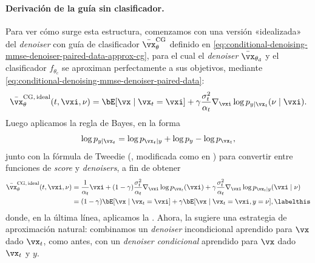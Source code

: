 \documentclass[../../book-main_es.tex]{subfiles}
\begin{document}
\paragraph{Derivación de la guía sin clasificador.} Para ver cómo surge esta
estructura, comenzamos con una versión «idealizada» del \textit{denoiser} con guía de clasificador
$\bar{\vx}_{\theta}^{\mathrm{CG}}$ definido en 
\eqref{eq:conditional-denoising-mmse-denoiser-paired-data-approx-cg},
para el cual el \textit{denoiser} $\bar{\vx}_{\theta_{\mathrm{d}}}$ y el clasificador
$f_{\theta_{\mathrm{c}}}$ se aproximan perfectamente a sus objetivos, mediante
\eqref{eq:conditional-denoising-mmse-denoiser-paired-data}:
\begin{equation}\label{eq:conditional-denoising-mmse-denoiser-paired-data-exact-cg}
    \bar{\vx}_{\theta}^{\mathrm{CG,\,ideal}}(t, \vxi, \nu)
    =
    \bE[\vx \mid \vx_t=\vxi]
    + \gamma\frac{\sigma_t^2}{\alpha_t}
    \nabla_{\vxi}\log p_{y \mid \vx_t}(\nu\mid \vxi).
\end{equation}
Luego aplicamos la regla de Bayes, en la forma
\begin{equation}
    \log p_{y \mid \vx_t}
    =
    \log p_{\vx_t \mid y} + \log p_{y} - \log p_{\vx_t},
\end{equation}
junto con la fórmula de Tweedie (, modificada como en
) para convertir entre funciones de \textit{score} y \textit{denoisers},
a fin de obtener
\begin{align*}
    \bar{\vx}_{\theta}^{\mathrm{CG,\,ideal}}(t, \vxi, \nu)
    &=
    \frac{1}{\alpha_t} \vxi
    + (1-\gamma) \frac{\sigma_t^2}{\alpha_t}
    \nabla_{\vxi}\log p_{\vx_t}(\vxi)
    + \gamma \frac{\sigma_t^2}{\alpha_t}
    \nabla_{\vxi}\log p_{\vx_t \mid y}(\vxi \mid \nu)
    \\
    &=
    (1 - \gamma) \bE[\vx \mid \vx_t=\vxi]
    +
    \gamma \bE[\vx \mid \vx_t=\vxi, y=\nu],
    \labelthis\label{eq:ideal-cfg-denoiser}
\end{align*}
donde, en la última línea, aplicamos la
.
Ahora, la  sugiere una estrategia de aproximación natural:
combinamos un \textit{denoiser} incondicional aprendido para $\vx$ dado $\vx_t$, como antes,
con un \textit{denoiser condicional} aprendido para $\vx$ dado $\vx_t$ y $y$.
\end{document}
